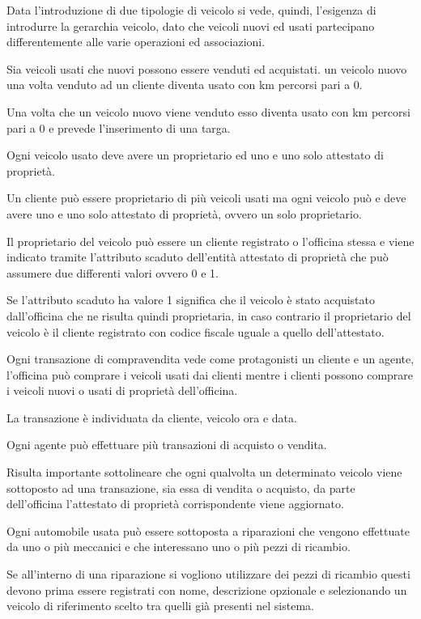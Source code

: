 \documentclass[a4paper,12pt]{report}
\begin{document}
Data l’introduzione di due tipologie di veicolo si vede, quindi, l’esigenza di introdurre la gerarchia veicolo, dato che veicoli 
%
nuovi ed usati partecipano differentemente alle varie operazioni ed associazioni.

Sia veicoli usati che nuovi possono essere venduti ed acquistati. un veicolo nuovo una volta venduto ad un cliente diventa usato 
%
con km percorsi pari a 0.

Una volta che un veicolo nuovo viene venduto esso diventa usato con km percorsi pari a 0 e prevede l’inserimento di una targa.

Ogni veicolo usato deve avere un proprietario ed uno e uno solo attestato di proprietà.

Un cliente può essere proprietario di più veicoli usati ma ogni veicolo può e deve avere uno e uno solo attestato di proprietà, 
%
ovvero un solo proprietario. 

Il proprietario del veicolo può essere un cliente registrato o l’officina stessa e viene indicato tramite l’attributo scaduto 
%
dell’entità attestato di proprietà che può assumere due differenti valori ovvero 0 e 1.

Se l’attributo scaduto ha valore 1 significa che il veicolo è stato acquistato dall’officina che ne risulta quindi proprietaria, 
%
in caso contrario il proprietario del veicolo è il cliente registrato con codice fiscale uguale a quello dell’attestato.

Ogni transazione di compravendita vede come protagonisti un cliente e un agente, l’officina può comprare i veicoli usati dai clienti 
%
mentre i clienti possono comprare i veicoli nuovi o usati di proprietà dell’officina.

La transazione è individuata da cliente, veicolo ora e data.

Ogni agente può effettuare più transazioni di acquisto o vendita.

Risulta importante sottolineare che ogni qualvolta un determinato veicolo viene sottoposto ad una transazione, sia essa di vendita o 
%
acquisto, da parte dell’officina l’attestato di proprietà corrispondente viene aggiornato.

Ogni automobile usata può essere sottoposta a riparazioni che vengono effettuate da uno o più meccanici e che interessano uno o più 
%
pezzi di ricambio.

Se all’interno di una riparazione si vogliono utilizzare dei pezzi di ricambio questi devono prima essere registrati con nome, 
%
descrizione opzionale e selezionando un veicolo di riferimento scelto tra quelli già presenti nel sistema.
\end{document}
